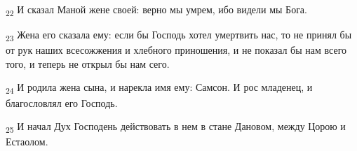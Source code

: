 \begin{tcolorbox}
\textsubscript{22} И сказал Маной жене своей: верно мы умрем, ибо видели мы Бога.
\end{tcolorbox}
\begin{tcolorbox}
\textsubscript{23} Жена его сказала ему: если бы Господь хотел умертвить нас, то не принял бы от рук наших всесожжения и хлебного приношения, и не показал бы нам всего того, и теперь не открыл бы нам сего.
\end{tcolorbox}
\begin{tcolorbox}
\textsubscript{24} И родила жена сына, и нарекла имя ему: Самсон. И рос младенец, и благословлял его Господь.
\end{tcolorbox}
\begin{tcolorbox}
\textsubscript{25} И начал Дух Господень действовать в нем в стане Дановом, между Цорою и Естаолом.
\end{tcolorbox}
